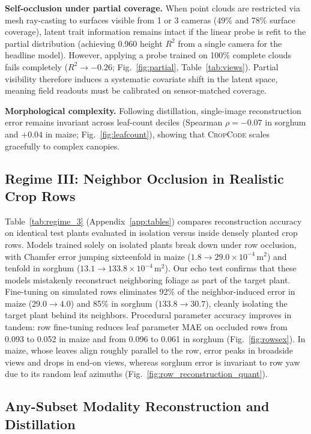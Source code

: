 \documentclass[10pt,twocolumn,letterpaper]{article}
\newcommand{\method}{\textsc{CropCode}}
\begin{document}
\noindent\textbf{Self-occlusion under partial coverage.}
When point clouds are restricted via mesh ray-casting to surfaces visible from 1 or 3 cameras (49\% and 78\% surface coverage), latent trait information remains intact if the linear probe is refit to the partial distribution (achieving 0.960 height $R^2$ from a single camera for the headline model). However, applying a probe trained on 100\% complete clouds fails completely ($R^2 \to -0.26$; Fig.~\ref{fig:partial}, Table~\ref{tab:views}). Partial visibility therefore induces a systematic covariate shift in the latent space, meaning field readouts must be calibrated on sensor-matched coverage.

\noindent\textbf{Morphological complexity.}
Following distillation, single-image reconstruction error remains invariant across leaf-count deciles (Spearman $\rho = -0.07$ in sorghum and $+0.04$ in maize; Fig.~\ref{fig:leafcount}), showing that \method{} scales gracefully to complex canopies.

\subsection{Regime III: Neighbor Occlusion in Realistic Crop Rows}
\label{sec:regime3}\label{sec:exp-occlusion}

Table~\ref{tab:regime_3} (Appendix~\ref{app:tables}) compares reconstruction accuracy on identical test plants evaluated in isolation versus inside densely planted crop rows. Models trained solely on isolated plants break down under row occlusion, with Chamfer error jumping sixteenfold in maize ($1.8 \to 29.0 \times 10^{-4}\,\mathrm{m}^2$) and tenfold in sorghum ($13.1 \to 133.8 \times 10^{-4}\,\mathrm{m}^2$). Our echo test confirms that these models mistakenly reconstruct neighboring foliage as part of the target plant. Fine-tuning on simulated rows eliminates 92\% of the neighbor-induced error in maize ($29.0 \to 4.0$) and 85\% in sorghum ($133.8 \to 30.7$), cleanly isolating the target plant behind its neighbors. Procedural parameter accuracy improves in tandem: row fine-tuning reduces leaf parameter MAE on occluded rows from 0.093 to 0.052 in maize and from 0.096 to 0.061 in sorghum (Fig.~\ref{fig:rowsex}). In maize, whose leaves align roughly parallel to the row, error peaks in broadside views and drops in end-on views, whereas sorghum error is invariant to row yaw due to its random leaf azimuths (Fig.~\ref{fig:row_reconstruction_quant}).

\subsection{Any-Subset Modality Reconstruction and Distillation}
\label{sec:res-distill}\label{sec:exp-main}
\end{document}
